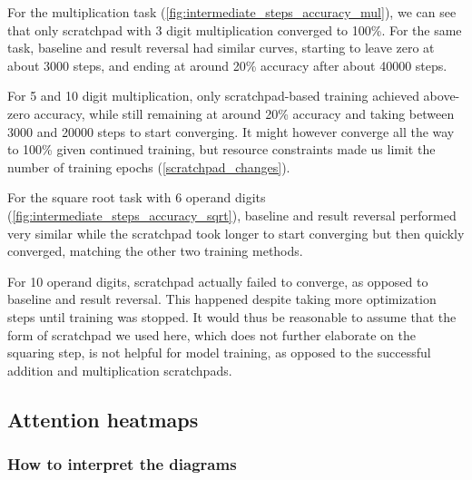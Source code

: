 For the multiplication task (\cref{fig:intermediate_steps_accuracy_mul}), we can see that only scratchpad with 3 digit multiplication converged to 100\%. For the same task, baseline and result reversal had similar curves, starting to leave zero at about 3000 steps, and ending at around 20\% accuracy after about 40000 steps.

For 5 and 10 digit multiplication, only scratchpad-based training achieved above-zero accuracy, while still remaining at around 20\% accuracy and taking between 3000 and 20000 steps to start converging.
It might however converge all the way to 100\% given continued training, but resource constraints made us limit the number of training epochs (\cref{scratchpad_changes}).


For the square root task with 6 operand digits (\cref{fig:intermediate_steps_accuracy_sqrt}), baseline and result reversal performed very similar while the scratchpad took longer to start converging but then quickly converged, matching the other two training methods.

For 10 operand digits, scratchpad actually failed to converge, as opposed to baseline and result reversal. This happened despite taking more optimization steps until training was stopped. It would thus be reasonable to assume that the form of scratchpad we used here, which does not further elaborate on the squaring step, is not helpful for model training, as opposed to the successful addition and multiplication scratchpads.





\subsection{Attention heatmaps}
\label{results:heatmap}


\subsubsection{How to interpret the diagrams}

